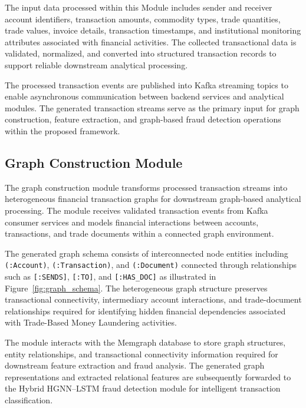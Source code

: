 The input data processed within this Module includes sender and receiver account identifiers, transaction amounts, commodity types, trade quantities, trade values, invoice details, transaction timestamps, and institutional monitoring attributes associated with financial activities. The collected transactional data is validated, normalized, and converted into structured transaction records to support reliable downstream analytical processing.

The processed transaction events are published into Kafka streaming topics to enable asynchronous communication between backend services and analytical modules. The generated transaction streams serve as the primary input for graph construction, feature extraction, and graph-based fraud detection operations within the proposed framework.


\subsection[Graph Construction Module]{\textbf{Graph Construction Module}}

The graph construction module transforms processed transaction streams into heterogeneous financial transaction graphs for downstream graph-based analytical processing. The module receives validated transaction events from Kafka consumer services and models financial interactions between accounts, transactions, and trade documents within a connected graph environment.

The generated graph schema consists of interconnected node entities including \texttt{(:Account)}, \texttt{(:Transaction)}, and \texttt{(:Document)} connected through relationships such as \texttt{[:SENDS]}, \texttt{[:TO]}, and \texttt{[:HAS\_DOC]} as illustrated in Figure~\ref{fig:graph_schema}. The heterogeneous graph structure preserves transactional connectivity, intermediary account interactions, and trade-document relationships required for identifying hidden financial dependencies associated with Trade-Based Money Laundering activities.

The module interacts with the Memgraph database to store graph structures, entity relationships, and transactional connectivity information required for downstream feature extraction and fraud analysis. The generated graph representations and extracted relational features are subsequently forwarded to the Hybrid HGNN--LSTM fraud detection module for intelligent transaction classification.

